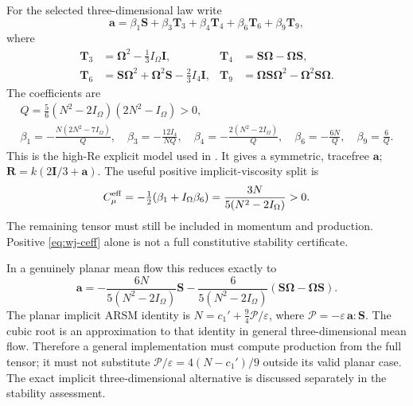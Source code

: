 \documentclass[11pt,a4paper]{article}
\numberwithin{equation}{section}
\newcommand{\eps}{\varepsilon}
\begin{document}
For the selected three-dimensional law write
\begin{equation}
 \bm a=\beta_1\bm S+\beta_3\bm T_3+\beta_4\bm T_4
                   +\beta_6\bm T_6+\beta_9\bm T_9,
 \label{eq:wj-3d}
\end{equation}
where
\begin{align}
 \bm T_3&=\bm\Omega^2-\tfrac13I_\Omega\bm I,&
 \bm T_4&=\bm S\bm\Omega-\bm\Omega\bm S,\nonumber\\
 \bm T_6&=\bm S\bm\Omega^2+\bm\Omega^2\bm S-\tfrac23I_4\bm I,&
 \bm T_9&=\bm\Omega\bm S\bm\Omega^2-\bm\Omega^2\bm S\bm\Omega.
 \label{eq:wj-basis}
\end{align}
The coefficients are
\begin{equation}
 \begin{gathered}
 Q=\tfrac56(N^2-2I_\Omega)(2N^2-I_\Omega)>0,\\
 \beta_1=-\frac{N(2N^2-7I_\Omega)}Q,\quad
 \beta_3=-\frac{12I_4}{NQ},\quad
 \beta_4=-\frac{2(N^2-2I_\Omega)}Q,\quad
 \beta_6=-\frac{6N}Q,\quad \beta_9=\frac6Q.
 \end{gathered}
 \label{eq:wj-coefficients}
\end{equation}
This is the high-Re explicit model used in \cite{Baungaard2022}.
It gives a symmetric, tracefree $\bm a$; $\bm R=k(2\bm I/3+\bm a)$.
The useful positive implicit-viscosity split is
\begin{equation}
 C_\mu^{\rm eff}
 =-\tfrac12(\beta_1+I_\Omega\beta_6)
 =\frac{3N}{5(N^2-2I_\Omega)}>0.
 \label{eq:wj-ceff}
\end{equation}
The remaining tensor must still be included in momentum and production.
Positive \eqref{eq:wj-ceff} alone is not a full constitutive stability
certificate.

In a genuinely planar mean flow this reduces exactly to
\begin{equation}
 \bm a=-\frac{6N}{5(N^2-2I_\Omega)}\bm S
       -\frac{6}{5(N^2-2I_\Omega)}
          (\bm S\bm\Omega-\bm\Omega\bm S).
 \label{eq:wj-2d}
\end{equation}
The planar implicit ARSM identity is
$N=c_1'+\tfrac94\mathcal P/\eps$, where
$\mathcal P=-\eps\,\bm a:\bm S$.
The cubic root is an approximation to that identity in general
three-dimensional mean flow. Therefore a general implementation must
compute production from the full tensor; it must not substitute
$\mathcal P/\eps=4(N-c_1')/9$ outside its valid planar case.
The exact implicit three-dimensional alternative is discussed separately
in the stability assessment.
\end{document}
